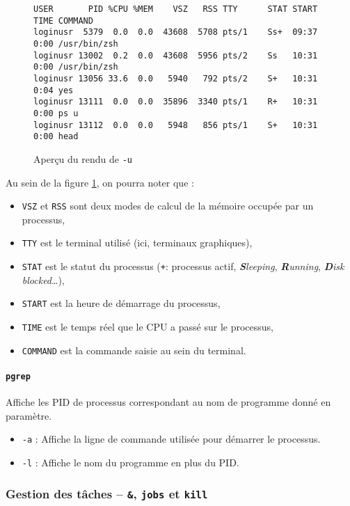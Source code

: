 \begin{figure}[bh!]
    \centering
    \begin{verbatim}
USER       PID %CPU %MEM    VSZ   RSS TTY      STAT START   TIME COMMAND
loginusr  5379  0.0  0.0  43608  5708 pts/1    Ss+  09:37   0:00 /usr/bin/zsh
loginusr 13002  0.2  0.0  43608  5956 pts/2    Ss   10:31   0:00 /usr/bin/zsh
loginusr 13056 33.6  0.0   5940   792 pts/2    S+   10:31   0:04 yes
loginusr 13111  0.0  0.0  35896  3340 pts/1    R+   10:31   0:00 ps u
loginusr 13112  0.0  0.0   5948   856 pts/1    S+   10:31   0:00 head
\end{verbatim}
    \vspace{-\baselineskip}\caption{Aperçu du rendu de  \texttt{-u}}
    \label{fig:ps}
\end{figure}
Au sein de la figure \ref{fig:ps}, on pourra noter que : 
\begin{itemize}
    \item \texttt{VSZ} et \texttt{RSS} sont deux modes de calcul de la mémoire occupée par un processus,
    \item \texttt{TTY} est le terminal utilisé (ici, terminaux graphiques),
    \item \texttt{STAT} est le statut du processus (\texttt{+}: processus actif, \textit{\textbf{S}leeping}, \textit{\textbf{R}unning}, \textit{\textbf{D}isk blocked}\dots),
    \item \texttt{START} est la heure de démarrage du processus,
    \item \texttt{TIME} est le temps réel que le CPU a passé sur le processus,
    \item \texttt{COMMAND} est la commande saisie au sein du terminal.
\end{itemize}

\paragraph{\texttt{pgrep}} 
Affiche les PID de processus correspondant au nom de programme donné en paramètre.
\begin{itemize}
    \item \texttt{-a} : Affiche la ligne de commande utilisée pour démarrer le processus.
    \item \texttt{-l} : Affiche le nom du programme en plus du PID.
\end{itemize}


\newpage
\subsubsection{Gestion des tâches -- \texttt{\&}, \texttt{jobs} et \texttt{kill}} \label{sec:tasks}

